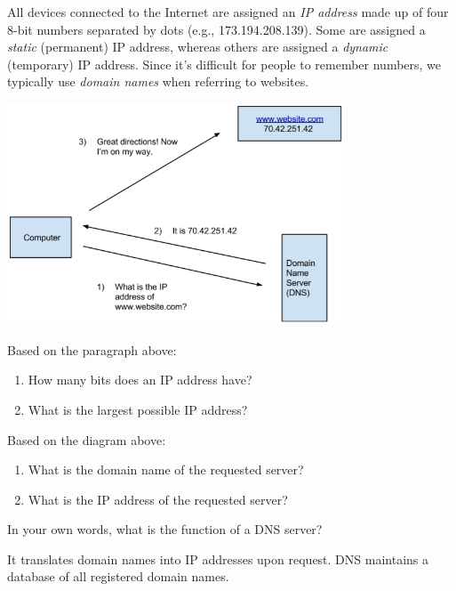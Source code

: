 

All devices connected to the Internet are assigned an \emph{IP address} made up of four 8-bit numbers separated by dots (e.g., 173.194.208.139). Some are assigned a \emph{static} (permanent) IP address, whereas others are assigned a \emph{dynamic} (temporary) IP address. Since it's difficult for people to remember numbers, we typically use \emph{domain names} when referring to websites.

\begin{center}
\includegraphics[width=0.75\textwidth]{CSP/dns1.png}
\end{center}




\Q Based on the paragraph above:
\begin{enumerate}
\item How many bits does an IP address have? 
\item What is the largest possible IP address? 
\end{enumerate}


\Q Based on the diagram above:
\begin{enumerate}
\item What is the domain name of the requested server? 
\item What is the IP address of the requested server? 
\end{enumerate}


\Q In your own words, what is the function of a DNS server?

\begin{answer}
It translates domain names into IP addresses upon request.
DNS maintains a database of all registered domain names.
\end{answer}


